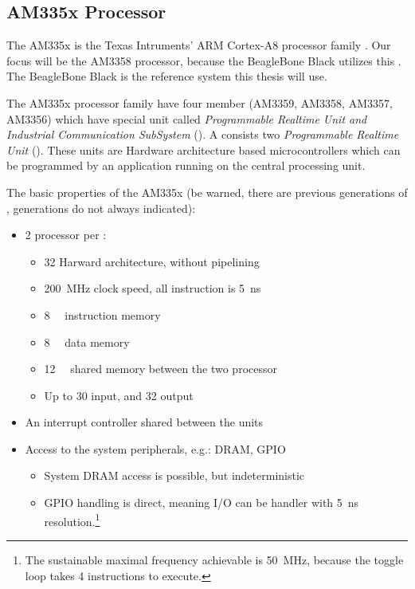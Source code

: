 \subsection{AM335x Processor}

The AM335x is the Texas Intruments' ARM Cortex-A8 processor family \citep{AM335x}. Our focus will be the AM3358 processor, because the BeagleBone Black \citep{BBB} utilizes this \cpu. The BeagleBone Black is the reference system this thesis will use.

The AM335x processor family have four member (AM3359, AM3358, AM3357, AM3356) which have special unit called \emph{Programmable Realtime Unit and Industrial Communication SubSystem} (\pruss). A \pruss consists two \emph{Programmable Realtime Unit} (\pru). These units are Hardware architecture based microcontrollers which can be programmed by an application running on the central processing unit.

The basic properties of the AM335x \pruss (be warned, there are previous generations of \pruss, generations do not always indicated):
\begin{itemize}
	\item 2 \pru processor per \pruss:
	\begin{itemize}
		\item \SI{32}{\bit} Harward architecture, without pipelining
		\item \SI{200}{\mega\hertz} clock speed, all instruction is \SI{5}{\nano\second}
		\item \SI{8}{\kilo\byte} instruction memory
		\item \SI{8}{\kilo\byte} data memory
		\item \SI{12}{\kilo\byte} shared memory between the two processor
		\item Up to 30 input, and 32 output
	\end{itemize}
	\item An interrupt controller shared between the units
	\item Access to the system peripherals, e.g.: DRAM, GPIO
	\begin{itemize}
		\item System DRAM access is possible, but indeterministic
		\item GPIO handling is direct, meaning I/O can be handler with \SI{5}{\nano\second} resolution.\footnote{The sustainable maximal frequency achievable is \SI{50}{\mega\hertz}, because the toggle loop takes 4 instructions to execute.}
	\end{itemize}
\end{itemize}


